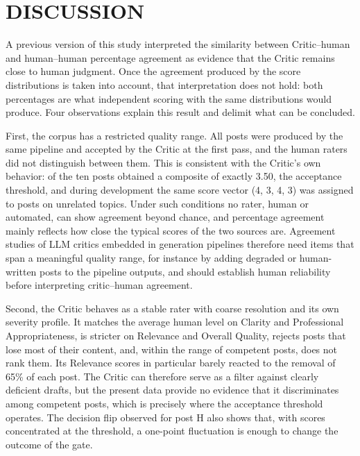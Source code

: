\documentclass[a4paper,twoside]{article}
\begin{document}
\section{\uppercase{Discussion}}
\label{sec:discussion}

A previous version of this study interpreted the similarity between Critic--human and human--human percentage agreement as evidence that the Critic remains close to human judgment. Once the agreement produced by the score distributions is taken into account, that interpretation does not hold: both percentages are what independent scoring with the same distributions would produce. Four observations explain this result and delimit what can be concluded.

First, the corpus has a restricted quality range. All posts were produced by the same pipeline and accepted by the Critic at the first pass, and the human raters did not distinguish between them. This is consistent with the Critic's own behavior: \CompAtThreshold{} of the ten posts obtained a composite of exactly 3.50, the acceptance threshold, and during development the same score vector (4, 3, 4, 3) was assigned to posts on unrelated topics. Under such conditions no rater, human or automated, can show agreement beyond chance, and percentage agreement mainly reflects how close the typical scores of the two sources are. Agreement studies of LLM critics embedded in generation pipelines therefore need items that span a meaningful quality range, for instance by adding degraded or human-written posts to the pipeline outputs, and should establish human reliability before interpreting critic--human agreement.

Second, the Critic behaves as a stable rater with coarse resolution and its own severity profile. It matches the average human level on Clarity and Professional Appropriateness, is stricter on Relevance and Overall Quality, rejects posts that lose most of their content, and, within the range of competent posts, does not rank them. Its Relevance scores in particular barely reacted to the removal of 65\% of each post. The Critic can therefore serve as a filter against clearly deficient drafts, but the present data provide no evidence that it discriminates among competent posts, which is precisely where the acceptance threshold operates. The decision flip observed for post H also shows that, with scores concentrated at the threshold, a one-point fluctuation is enough to change the outcome of the gate.
\end{document}
